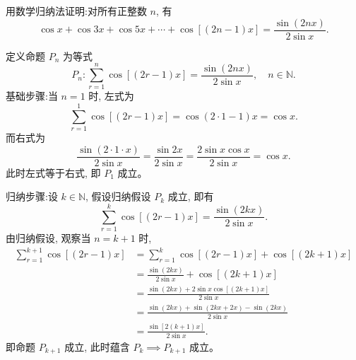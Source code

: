 \begin{questions}

    \question 用数学归纳法证明:对所有正整数 $n$, 有
    \[
    \cos x + \cos 3x + \cos 5x + \cdots + \cos[(2n-1)x] = \frac{\sin(2nx)}{2\sin x}.
    \]
    \begin{solution}
        定义命题 $P_n$ 为等式
        \[
        P_n:\sum_{r=1}^{n} \cos[(2r-1)x] = \frac{\sin(2nx)}{2\sin x}, \quad n \in \mathbb{N}.
        \]
        基础步骤:当 $n=1$ 时, 左式为
        \[
        \sum_{r=1}^{1} \cos[(2r-1)x] = \cos(2 \cdot 1 - 1)x = \cos x.
        \]
        而右式为
        \[
        \frac{\sin(2 \cdot 1 \cdot x)}{2\sin x} = \frac{\sin 2x}{2\sin x} = \frac{2\sin x \cos x}{2\sin x} = \cos x.
        \]
        此时左式等于右式, 即 $P_1$ 成立。

        归纳步骤:设 $k \in \mathbb{N}$, 假设归纳假设 $P_k$ 成立, 即有
        \[
        \sum_{r=1}^{k} \cos[(2r-1)x] = \frac{\sin(2kx)}{2\sin x}.
        \]
        由归纳假设, 观察当 $n=k+1$ 时,
        \begin{align}
        \sum_{r=1}^{k+1} \cos[(2r-1)x] &=  \sum_{r=1}^{k} \cos[(2r-1)x] + \cos[(2k+1)x] \\
        &= \frac{\sin(2kx)}{2\sin x} + \cos[(2k+1)x] \\
        &= \frac{\sin(2kx) + 2\sin x \cos[(2k+1)x]}{2\sin x} \\
        &= \frac{\sin(2kx) + \sin(2kx+2x) - \sin(2kx)}{2\sin x} \\
        &= \frac{\sin[2(k+1)x]}{2\sin x}.
        \end{align}
        即命题 $P_{k+1}$ 成立, 此时蕴含 $P_k \implies P_{k+1}$ 成立。


\end{solution}
\end{questions}
